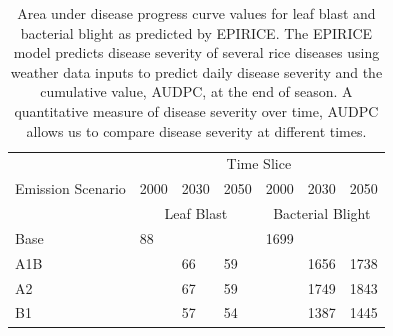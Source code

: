 \documentclass[preprint,12pt]{elsarticle}
\begin{document}

\begin{table}[h]
\begin{tabular}{@{}lllllll@{}}
\toprule
\multicolumn{1}{c}{\multirow{3}{*}{Emission Scenario}} & \multicolumn{6}{c}{Time Slice}                                                                                                                                  \\ \cmidrule(l){2-7} 
\multicolumn{1}{c}{}                                   & \multicolumn{1}{c}{2000} & \multicolumn{1}{c}{2030} & \multicolumn{1}{c}{2050} & \multicolumn{1}{c}{2000} & \multicolumn{1}{c}{2030} & \multicolumn{1}{c}{2050} \\ \cmidrule(l){2-7} 
\multicolumn{1}{c}{}                                   & \multicolumn{3}{c}{Leaf Blast}                                                 & \multicolumn{3}{c}{Bacterial Blight}                                           \\ \midrule
Base                                                   & 88                       &                          &                          & 1699                     &                          &                          \\
A1B                                                    &                          & 66                       & 59                       &                          & 1656                     & 1738                     \\
A2                                                     &                          & 67                       & 59                       &                          & 1749                     & 1843                     \\
B1                                                     &                          & 57                       & 54                       &                          & 1387                     & 1445                     \\ \bottomrule
\end{tabular}
\caption{Area under disease progress curve values for leaf blast and bacterial blight as predicted by EPIRICE. The EPIRICE model predicts disease severity of several rice diseases using weather data inputs to predict daily disease severity and the cumulative value, AUDPC, at the end of season. A quantitative measure of disease severity over time, AUDPC allows us to compare disease severity at different times.}
\label{AUDPCTable}
\end{table}
\end{document}
